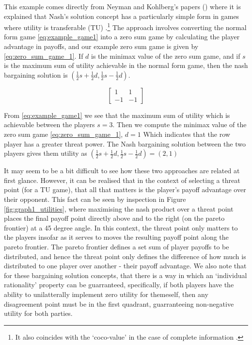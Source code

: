 This example comes directly from Neyman and Kohlberg's papers (\cite{value2,value1}) where it is explained that Nash's solution concept has a particularly simple form in games where utility is transferable (TU) \cite{value2,shap_lectures,value1}.\footnote{It also coincides with the `coco-value' in the case of complete information \cite{kalai1,Kalai2010}.}
The approach involves converting the normal form game \eqref{eq:example_game1} into a zero sum game by calculating the player advantage in payoffs, and our example zero sum game is given by \eqref{eq:zero_sum_game_1}.
If $d$ is the minimax value of the zero sum game, and if $s$ is the maximum sum of utility achievable in the normal form game, then the nash bargaining solution is $(\frac{1}{2}s+\frac{1}{2}d,\frac{1}{2}s-\frac{1}{2}d)$.

\begin{equation}\label{eq:zero_sum_game_1} \begin{bmatrix}1 & 1\\ -1 & -1\end{bmatrix} \end{equation}

\begin{solution}[TU approach]
From \eqref{eq:example_game1} we see that the maximum sum of utility which is achievable between the players $s=3$. Then we compute the minimax value of the zero sum game \eqref{eq:zero_sum_game_1}, $d=1$ Which indicates that the row player has a greater threat power.
The Nash bargaining solution between the two players gives them utility as $(\frac{1}{2}s+\frac{1}{2}d,\frac{1}{2}s-\frac{1}{2}d) = (2,1)$
\end{solution}

It may seem to be a bit difficult to see how these two approaches are related at first glance.
However, it can be realised that in the context of selecting a threat point (for a TU game), that all that matters is the player's payoff advantage over their opponent.
This fact can be seen by inspection in Figure \ref{fig:graph1_utilities}, where maximising the nash product over a threat point places the final payoff point directly above and to the right (on the pareto frontier) at a 45 degree angle.
In this context, the threat point only matters to the players insofar as it serves to moves the resulting payoff point along the pareto frontier.
The pareto frontier defines a set sum of player payoffs to be distributed, and hence the threat point only defines the difference of how much is distributed to one player over another - their payoff advantage. We also note that for these bargaining solution concepts, that there is a way in which an `individual rationality' property can be guarranteed, specifically, if both players have the ability to unilatterally implement zero utility for themeself, then any disagreement point must be in the first quadrant, guarranteeing non-negative utility for both parties.\\

